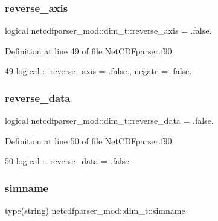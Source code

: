 \subsubsection{\texorpdfstring{reverse\+\_\+axis}{reverse\_axis}}
{\footnotesize\ttfamily logical netcdfparser\+\_\+mod\+::dim\+\_\+t\+::reverse\+\_\+axis = .false.\hspace{0.3cm}{\ttfamily [private]}}



Definition at line 49 of file Net\+C\+D\+Fparser.\+f90.


\begin{DoxyCode}
49         \textcolor{keywordtype}{logical} :: reverse\_axis = .false., negate = .false.
\end{DoxyCode}
\mbox{\label{structnetcdfparser__mod_1_1dim__t_acf99009f46de2c7f946506d74977c2c5}} 
\subsubsection{\texorpdfstring{reverse\+\_\+data}{reverse\_data}}
{\footnotesize\ttfamily logical netcdfparser\+\_\+mod\+::dim\+\_\+t\+::reverse\+\_\+data = .false.\hspace{0.3cm}{\ttfamily [private]}}



Definition at line 50 of file Net\+C\+D\+Fparser.\+f90.


\begin{DoxyCode}
50         \textcolor{keywordtype}{logical} :: reverse\_data = .false.
\end{DoxyCode}
\mbox{\label{structnetcdfparser__mod_1_1dim__t_a14ab4a777ae4e2429332ddc08f875601}} 
\subsubsection{\texorpdfstring{simname}{simname}}
{\footnotesize\ttfamily type(string) netcdfparser\+\_\+mod\+::dim\+\_\+t\+::simname\hspace{0.3cm}{\ttfamily [private]}}



